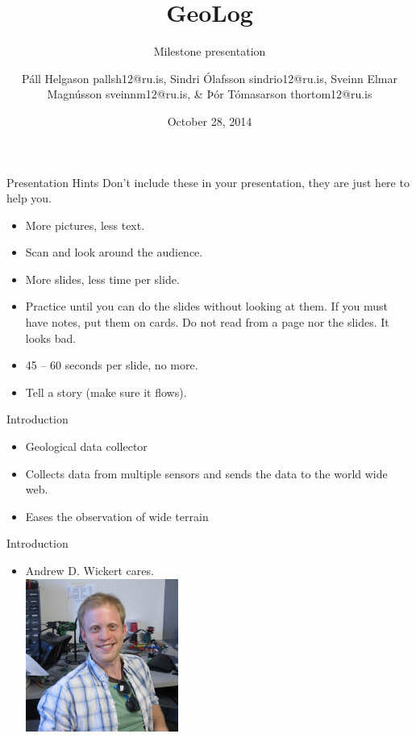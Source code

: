 \documentclass{beamer}
\title{GeoLog}
\subtitle{Milestone presentation}
\author[P. Helgasson, S. Ólafsson, S. Magnússon, \& Þ. Tómasarson]{Páll Helgason pallsh12@ru.is, Sindri Ólafsson sindrio12@ru.is, Sveinn Elmar Magnússon sveinnm12@ru.is, \& Þór Tómasarson thortom12@ru.is}
\institute[RU]{
  Department of Science and Engineering (TVD) \\
  Reykjavík University \\
}
\date{October 28, 2014} %
\begin{document}
\begin{frame}[plain]
  \titlepage
\end{frame}

\begin{frame}{Presentation Hints}
Don't include these in your presentation, they are just here to help you.
\begin{itemize}
\item More pictures, less text.
\item Scan and look around the audience.
\item More slides, less time per slide.
\item Practice until you can do the slides without looking at them.
  If you must have notes, put them on cards.  Do not read from a page
  nor the slides.  It looks bad.
\item 45 -- 60 seconds per slide, no more.
\item Tell a story (make sure it flows).
\end{itemize}
\end{frame}

\begin{frame}{Introduction}
\begin{itemize}
\item Geological data collector
\item Collects data from multiple sensors and sends the data to the world wide web. 
\item Eases the observation of wide terrain
\end{itemize}
\end{frame}

\begin{frame}{Introduction}
\begin{itemize}
\item Andrew D. Wickert cares.\\
\centering
\includegraphics[height=5cm]{graphics/andrewWickert.png}
\cite{AffordableWS}
\end{itemize}
\end{frame}
\end{document}
